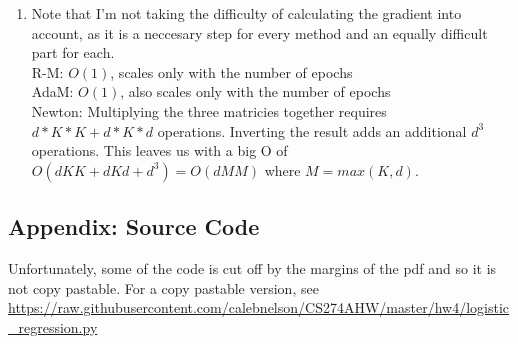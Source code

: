 \documentclass[11pt]{article}
\begin{document}
\begin{enumerate}
\begin{enumerate}
\item
Note that I'm not taking the difficulty of calculating the gradient into account, as it is a neccesary step for every method and an equally difficult part for each. \\
R-M: $O(1)$, scales only with the number of epochs \\
AdaM: $O(1)$, also scales only with the number of epochs \\
Newton: Multiplying the three matricies together requires $d*K*K + d*K*d$ operations. Inverting the result adds an additional $d^3$ operations. 
This leaves us with a big O of $O(dKK + dKd + d^3) = O(dMM)$ where $M = max(K, d)$.
\end{enumerate}
\end{enumerate}

\pagebreak
\subsection*{Appendix: Source Code}
Unfortunately, some of the code is cut off by the margins of the pdf and so it is not copy pastable. For a copy pastable version, see \url{https://raw.githubusercontent.com/calebnelson/CS274AHW/master/hw4/logistic_regression.py}
\end{document}
